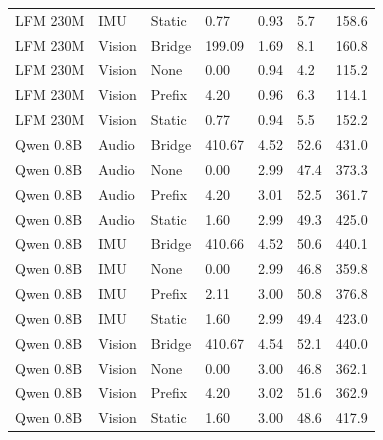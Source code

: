 {\begin{longtable}{@{}lllllll@{}}
LFM 230M & IMU & Static & 0.77 & 0.93 & 5.7 & 158.6 \\
LFM 230M & Vision & Bridge & 199.09 & 1.69 & 8.1 & 160.8 \\
LFM 230M & Vision & None & 0.00 & 0.94 & 4.2 & 115.2 \\
LFM 230M & Vision & Prefix & 4.20 & 0.96 & 6.3 & 114.1 \\
LFM 230M & Vision & Static & 0.77 & 0.94 & 5.5 & 152.2 \\
Qwen 0.8B & Audio & Bridge & 410.67 & 4.52 & 52.6 & 431.0 \\
Qwen 0.8B & Audio & None & 0.00 & 2.99 & 47.4 & 373.3 \\
Qwen 0.8B & Audio & Prefix & 4.20 & 3.01 & 52.5 & 361.7 \\
Qwen 0.8B & Audio & Static & 1.60 & 2.99 & 49.3 & 425.0 \\
Qwen 0.8B & IMU & Bridge & 410.66 & 4.52 & 50.6 & 440.1 \\
Qwen 0.8B & IMU & None & 0.00 & 2.99 & 46.8 & 359.8 \\
Qwen 0.8B & IMU & Prefix & 2.11 & 3.00 & 50.8 & 376.8 \\
Qwen 0.8B & IMU & Static & 1.60 & 2.99 & 49.4 & 423.0 \\
Qwen 0.8B & Vision & Bridge & 410.67 & 4.54 & 52.1 & 440.0 \\
Qwen 0.8B & Vision & None & 0.00 & 3.00 & 46.8 & 362.1 \\
Qwen 0.8B & Vision & Prefix & 4.20 & 3.02 & 51.6 & 362.9 \\
Qwen 0.8B & Vision & Static & 1.60 & 3.00 & 48.6 & 417.9 \\
\bottomrule
\end{longtable}}\par
